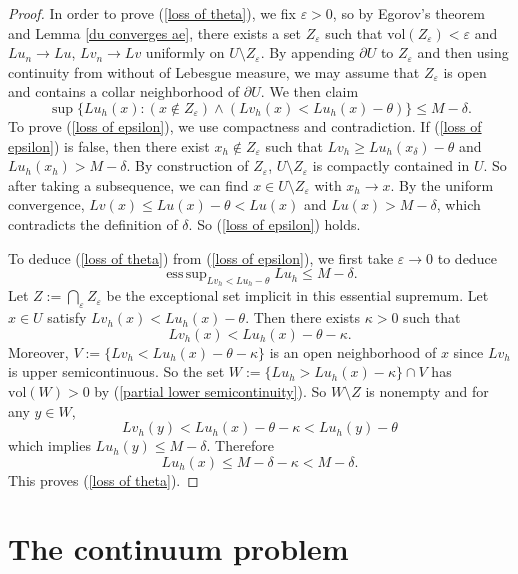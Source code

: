 \documentclass[reqno,11pt]{amsart}
\newcommand{\vol}{\mathrm{vol}}
\DeclareMathOperator*{\esssup}{ess\,sup}
\theoremstyle{definition}
\numberwithin{equation}{section}
\begin{document}
\begin{proof}
In order to prove (\ref{loss of theta}), we fix $\varepsilon > 0$, so by Egorov's theorem and Lemma \ref{du converges ae}, there exists a set $Z_\varepsilon$ such that $\vol(Z_\varepsilon) < \varepsilon$ and $Lu_n \to Lu$, $Lv_n \to Lv$ uniformly on $U \setminus Z_\varepsilon$.
By appending $\partial U$ to $Z_\varepsilon$ and then using continuity from without of Lebesgue measure, we may assume that $Z_\varepsilon$ is open and contains a collar neighborhood of $\partial U$.
We then claim 
\begin{equation}\label{loss of epsilon}
\sup \{Lu_h(x): (x \notin Z_\varepsilon) \wedge (Lv_h(x) < Lu_h(x) - \theta)\} \leq M - \delta.
\end{equation}
To prove (\ref{loss of epsilon}), we use compactness and contradiction.
If (\ref{loss of epsilon}) is false, then there exist $x_h \notin Z_\varepsilon$ such that $Lv_h \geq Lu_h(x_\delta) - \theta$ and $Lu_h(x_h) > M - \delta$.
By construction of $Z_\varepsilon$, $U \setminus Z_\varepsilon$ is compactly contained in $U$.
So after taking a subsequence, we can find $x \in U \setminus Z_\varepsilon$ with $x_h \to x$.
By the uniform convergence, $Lv(x) \leq Lu(x) - \theta < Lu(x)$ and $Lu(x) > M - \delta$, which contradicts the definition of $\delta$.
So (\ref{loss of epsilon}) holds.

To deduce (\ref{loss of theta}) from (\ref{loss of epsilon}), we first take $\varepsilon \to 0$ to deduce 
$$\esssup_{Lv_h < Lu_h - \theta} Lu_h \leq M - \delta.$$
Let $Z := \bigcap_\varepsilon Z_\varepsilon$ be the exceptional set implicit in this essential supremum.
Let $x \in U$ satisfy $Lv_h(x) < Lu_h(x) - \theta$.
Then there exists $\kappa > 0$ such that
$$Lv_h(x) < Lu_h(x) - \theta - \kappa.$$
Moreover, $V := \{Lv_h < Lu_h(x) - \theta - \kappa\}$ is an open neighborhood of $x$ since $Lv_h$ is upper semicontinuous.
So the set $W := \{Lu_h > Lu_h(x) - \kappa\} \cap V$ has $\vol(W) > 0$ by (\ref{partial lower semicontinuity}).
So $W \setminus Z$ is nonempty and for any $y \in W$,
$$Lv_h(y) < Lu_h(x) - \theta - \kappa < Lu_h(y) - \theta$$
which implies $Lu_h(y) \leq M - \delta$.
Therefore
$$Lu_h(x) \leq M - \delta - \kappa < M - \delta.$$
This proves (\ref{loss of theta}).
\end{proof}


\section{The continuum problem}
\end{document}

